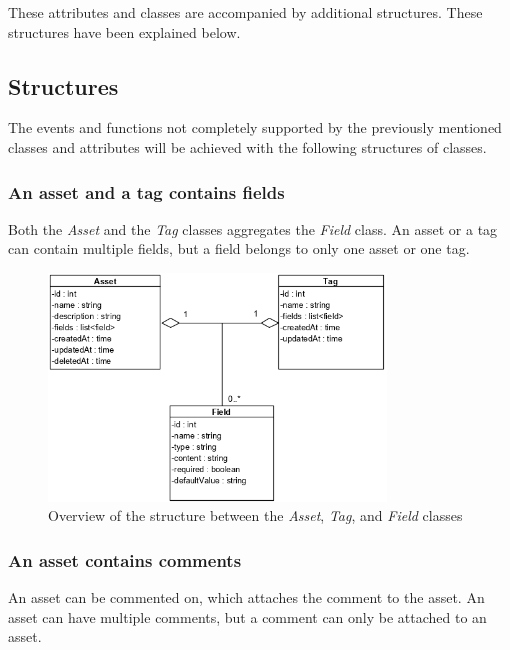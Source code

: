 These attributes and classes are accompanied by additional structures. These structures have been explained below.

\subsection{Structures}
The events and functions not completely supported by the previously mentioned classes and attributes will be achieved with the following structures of classes.

\subsubsection{An asset and a tag contains fields}
Both the \textit{Asset} and the \textit{Tag} classes aggregates the \textit{Field} class. An asset or a tag can contain multiple fields, but a field belongs to only one asset or one tag.

\begin{figure}[H]
    \centering
    \includegraphics[width=0.8\textwidth]{figures/Structures/AssetTagFieldStructure.png}
    \caption{Overview of the structure between the \textit{Asset}, \textit{Tag}, and \textit{Field} classes}
    \label{fig:AssetTagFieldStructure}
\end{figure}

\subsubsection{An asset contains comments}
An asset can be commented on, which attaches the comment to the asset. An asset can have multiple comments, but a comment can only be attached to an asset.

